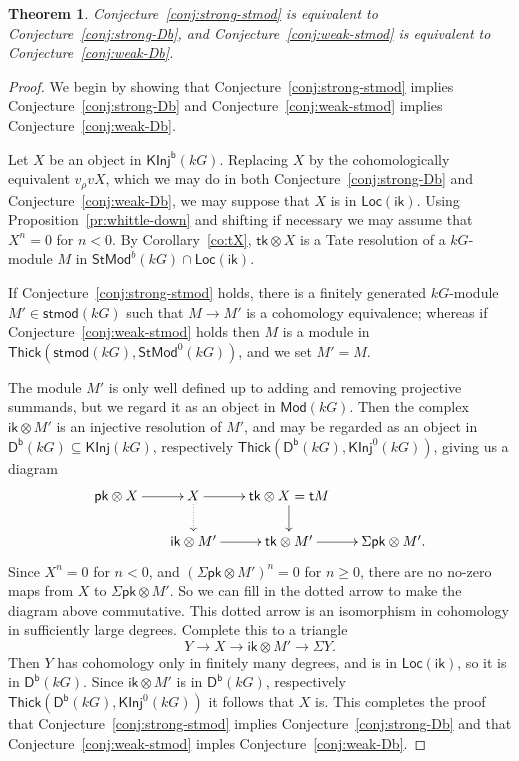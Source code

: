 \documentclass[12pt]{amsart}
\newcommand{\DD}{\mathsf{D}}%
\newcommand{\Db}{\DD^{\mathsf{b}}}%
\newcommand{\ik}{\mathsf{ik}}
\newcommand{\kG}{\kk G}
\newcommand{\kk}{k}
\newcommand{\KInj}{\mathsf{KInj}}
\newcommand{\KInjb}{\KInj^{\mathsf{b}}}
\newcommand{\Loc}{\mathsf{Loc}}
\newcommand{\Mod}{\mathsf{Mod}}
\newcommand{\pk}{\mathsf{pk}}
\newcommand{\stmod}{\mathsf{stmod}}
\newcommand{\StMod}{\mathsf{StMod}}
\newcommand{\Thick}{\mathsf{Thick}}
\newcommand{\tk}{\mathsf{tk}}
\newcommand{\tM}{\mathsf{t}M}
\renewcommand{\ge}{\geqslant}
\numberwithin{equation}{section}
\theoremstyle{plain}
\newtheorem{theorem}[equation]{Theorem}
\theoremstyle{definition}
\theoremstyle{remark}
\begin{document}
\begin{theorem}\label{th:equivalences}
Conjecture~\ref{conj:strong-stmod} is equivalent to
Conjecture~\ref{conj:strong-Db}, and Conjecture~\ref{conj:weak-stmod}
is equivalent to Conjecture~\ref{conj:weak-Db}.
\end{theorem}
\begin{proof}
We begin by showing that Conjecture~\ref{conj:strong-stmod} implies
Conjecture~\ref{conj:strong-Db} and Conjecture~\ref{conj:weak-stmod}
implies Conjecture~\ref{conj:weak-Db}. 
  
Let $X$ be an object in $\KInjb(\kG)$.
Replacing $X$ by the
cohomologically equivalent $v_\rho v X$, which we may do in both
Conjecture~\ref{conj:strong-Db} and Conjecture~\ref{conj:weak-Db},
we may suppose that $X$ is in $\Loc(\ik)$. Using
Proposition~\ref{pr:whittle-down} and
shifting if necessary we may assume that $X^n=0$ for $n<0$.  
By Corollary~\ref{co:tX}, $\tk \otimes X$ is a Tate resolution of a
$\kG$-module $M$ in $\StMod^b(\kG)\cap \Loc(\ik)$. 

If
Conjecture~\ref{conj:strong-stmod} holds, there is a finitely generated
$\kG$-module $M'\in \stmod(\kG)$ such that $M\to M'$ is a cohomology
equivalence; whereas if Conjecture~\ref{conj:weak-stmod} holds then
$M$ is a module in $\Thick(\stmod(\kG),\StMod^0(\kG))$, and we set
$M'=M$.

The module $M'$ is
only well defined up to adding and removing projective summands, but we
regard it as an object in $\Mod(\kG)$.
Then the complex $\ik \otimes M'$ is an injective resolution of $M'$, and 
may be regarded as an object in 
$\Db(\kG)\subseteq\KInj(\kG)$, respectively $\Thick(\Db(\kG),\KInj^0(\kG))$,
giving us a diagram
\[ \xymatrix@=6mm{\pk \otimes X \ar[r] & X \ar[r]\ar@{.>}[d]
 & \tk\otimes X = \tM\ar[d] \\
&\ik \otimes M' \ar[r]& \tk \otimes M' \ar[r] & \Sigma \pk \otimes M'.} \]
Since $X^n=0$ for $n<0$, and $(\Sigma\pk\otimes M')^n=0$ for $n\ge 0$, 
 there are no no-zero maps from $X$ to $\Sigma
\pk \otimes M'$. So we can fill
in the dotted arrow to make the diagram above commutative. This dotted
arrow is an isomorphism in cohomology in sufficiently large degrees.
Complete this to a triangle
\[ Y \to X \to \ik\otimes M' \to \Sigma Y. \]
Then $Y$ has cohomology only in finitely many degrees, and is in
$\Loc(\ik)$, so it is in $\Db(\kG)$. Since $\ik \otimes M'$ is  in
$\Db(\kG)$, respectively $\Thick(\Db(\kG),\KInj^0(\kG))$ 
it follows that $X$ is. This completes the proof that
Conjecture~\ref{conj:strong-stmod} implies
Conjecture~\ref{conj:strong-Db} and that
Conjecture~\ref{conj:weak-stmod} imples Conjecture~\ref{conj:weak-Db}.


\end{proof}
\end{document}
